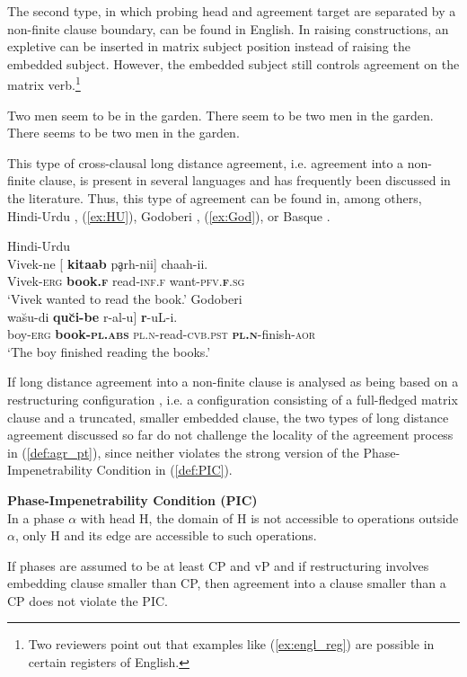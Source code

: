\documentclass[output=paper
,modfonts
,nonflat]{langsci/langscibook}
\begin{document}
The second type, in which probing head and agreement target are separated by a non-finite clause boundary, can be found in English. In raising constructions, an expletive can be inserted in matrix subject position instead of raising the embedded subject. However, the embedded subject still controls agreement on the matrix verb.\footnote{Two reviewers point out that examples like (\ref{ex:engl_reg}) are possible in certain registers of English.}
\begin{exe}
\ex	
	\xlist
	\ex Two men seem to be in the garden.
	\ex There seem to be two men in the garden.
	\ex *There seems to be two men in the garden.\label{ex:engl_reg}
	\endxlist
\end{exe}
This type of cross-clausal long distance agreement, i.e. agreement into a non-finite clause, is present in several languages and has frequently been discussed in the literature. Thus, this type of agreement can be found in, among others, Hindi-Urdu \citep{Bhatt2005}, (\ref{ex:HU}), Godoberi \citep{Haspelmath1999}, (\ref{ex:God}), or Basque \citep{Preminger2009}.  
\begin{exe}
\ex
	\xlist
	\ex Hindi-Urdu \citep[][760]{Bhatt2005}\label{ex:HU}\\
		\gll Vivek-ne {[} \textbf{kitaab} pḁrh-nii] chaah-ii.\\
		 Vivek-\textsc{erg} {} \textbf{book.\textsc{f}} read-\textsc{inf.f} want-\textsc{pfv.\textbf{f}.sg}\\
		\glt `Vivek wanted to read the book.' \hfill 
	\ex	Godoberi  \citep[][136]{Haspelmath1999}\label{ex:God}\\
		\gll {[} wa\u{s}u-di \textbf{qu\u{c}i-be} r-al-u] \textbf{r}-uL-i.\\
		 {} boy-\textsc{erg} \textbf{book-\textsc{pl.abs}} \textsc{pl.n}-read-\textsc{cvb.pst} \textbf{\textsc{pl.n}}-finish-\textsc{aor}\\
		\glt `The boy finished reading the books.' \hfill
	\endxlist
\end{exe}
If long distance agreement into a non-finite clause is analysed as being based on a restructuring configuration \citep{Wurmbrand2001}, i.e. a configuration consisting of a full-fledged matrix clause and a truncated, smaller embedded clause, the two types of long distance agreement discussed so far do not challenge the locality of the agreement process in (\ref{def:agr_pt}), since neither violates the strong version of the Phase-Impenetrability Condition in (\ref{def:PIC}).
\begin{exe} 
	\ex \label{def:PIC} \textbf{Phase-Impenetrability Condition (PIC)} \citep{Chomsky2001}\\
	In a phase $ \alpha $ with head H, the domain of H is not accessible to operations outside $ \alpha $, only H and its edge are accessible to such operations.
\end{exe}
If phases are assumed to be at least CP and vP and if restructuring involves embedding clause smaller than CP, then agreement into a clause smaller than a CP does not violate the PIC.
\end{document}
